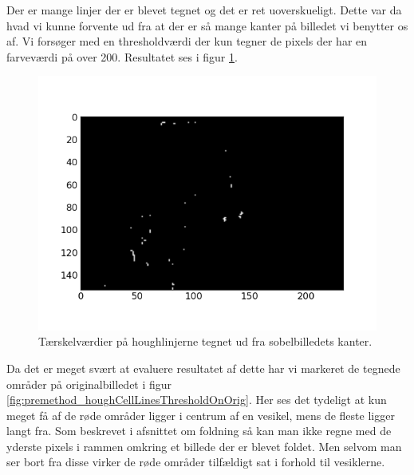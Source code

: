 Der er mange linjer der er blevet tegnet og det er ret uoverskueligt. Dette var da hvad vi kunne forvente ud fra at der er så mange kanter på billedet vi benytter os af. Vi forsøger med en thresholdværdi der kun tegner de pixels der har en farveværdi på over 200. Resultatet ses i figur \ref{fig:premethod_houghCellLinesThreshold}.

\begin{figure}[H]
	\centering
	\includegraphics[scale=0.8]{files/premethod/img/houghthreshold.png}
	\caption{Tærskelværdier på houghlinjerne tegnet ud fra sobelbilledets kanter.\label{fig:premethod_houghCellLinesThreshold}}
\end{figure}

Da det er meget svært at evaluere resultatet af dette har vi markeret de tegnede områder på originalbilledet i figur \ref{fig:premethod_houghCellLinesThresholdOnOrig}. Her ses det tydeligt at kun meget få af de røde områder ligger i centrum af en vesikel, mens de fleste ligger langt fra. Som beskrevet i afsnittet om foldning så kan man ikke regne med de yderste pixels i rammen omkring et billede der er blevet foldet. Men selvom man ser bort fra disse virker de røde områder tilfældigt sat i forhold til vesiklerne.

